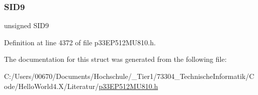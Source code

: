 \subsubsection{\texorpdfstring{S\+I\+D9}{SID9}}
{\footnotesize\ttfamily unsigned S\+I\+D9}



Definition at line 4372 of file p33\+E\+P512\+M\+U810.\+h.



The documentation for this struct was generated from the following file\+:\begin{DoxyCompactItemize}
\item 
C\+:/\+Users/00670/\+Documents/\+Hochschule/\+\_\+\+Tier1/73304\+\_\+\+Technische\+Informatik/\+Code/\+Hello\+World4.\+X/\+Literatur/\hyperlink{p33_e_p512_m_u810_8h}{p33\+E\+P512\+M\+U810.\+h}\end{DoxyCompactItemize}
